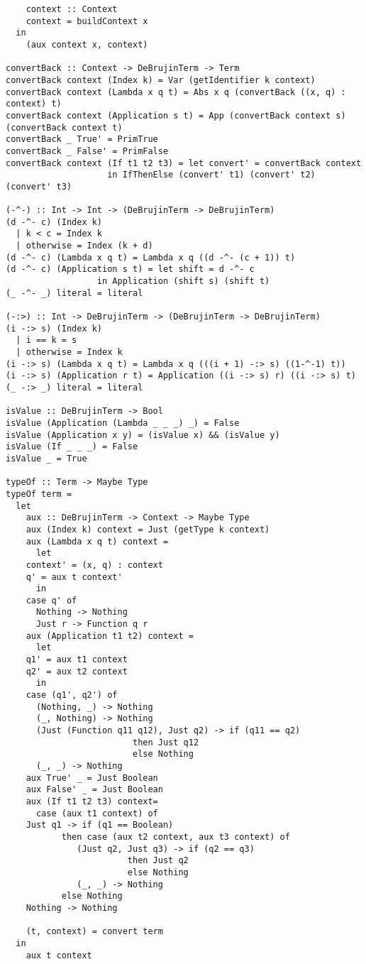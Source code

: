 \documentclass[11pt]{article}
\begin{document}
\begin{verbatim}
    context :: Context
    context = buildContext x
  in
    (aux context x, context)

convertBack :: Context -> DeBrujinTerm -> Term
convertBack context (Index k) = Var (getIdentifier k context)
convertBack context (Lambda x q t) = Abs x q (convertBack ((x, q) : context) t)
convertBack context (Application s t) = App (convertBack context s) (convertBack context t)
convertBack _ True' = PrimTrue
convertBack _ False' = PrimFalse
convertBack context (If t1 t2 t3) = let convert' = convertBack context
				    in IfThenElse (convert' t1) (convert' t2) (convert' t3)

(-^-) :: Int -> Int -> (DeBrujinTerm -> DeBrujinTerm)
(d -^- c) (Index k)
  | k < c = Index k
  | otherwise = Index (k + d)
(d -^- c) (Lambda x q t) = Lambda x q ((d -^- (c + 1)) t)
(d -^- c) (Application s t) = let shift = d -^- c
			      in Application (shift s) (shift t)
(_ -^- _) literal = literal

(-:>) :: Int -> DeBrujinTerm -> (DeBrujinTerm -> DeBrujinTerm)
(i -:> s) (Index k)
  | i == k = s
  | otherwise = Index k
(i -:> s) (Lambda x q t) = Lambda x q (((i + 1) -:> s) ((1-^-1) t))
(i -:> s) (Application r t) = Application ((i -:> s) r) ((i -:> s) t)
(_ -:> _) literal = literal

isValue :: DeBrujinTerm -> Bool
isValue (Application (Lambda _ _ _) _) = False
isValue (Application x y) = (isValue x) && (isValue y)
isValue (If _ _ _) = False
isValue _ = True

typeOf :: Term -> Maybe Type
typeOf term =
  let
    aux :: DeBrujinTerm -> Context -> Maybe Type
    aux (Index k) context = Just (getType k context)
    aux (Lambda x q t) context =
      let
	context' = (x, q) : context
	q' = aux t context'
      in
	case q' of
	  Nothing -> Nothing
	  Just r -> Function q r
    aux (Application t1 t2) context =
      let
	q1' = aux t1 context
	q2' = aux t2 context
      in
	case (q1', q2') of
	  (Nothing, _) -> Nothing
	  (_, Nothing) -> Nothing
	  (Just (Function q11 q12), Just q2) -> if (q11 == q2)
						 then Just q12
						 else Nothing
	  (_, _) -> Nothing
    aux True' _ = Just Boolean
    aux False' _ = Just Boolean
    aux (If t1 t2 t3) context=
      case (aux t1 context) of
	Just q1 -> if (q1 == Boolean)
		   then case (aux t2 context, aux t3 context) of
			  (Just q2, Just q3) -> if (q2 == q3)
						then Just q2
						else Nothing
			  (_, _) -> Nothing
		   else Nothing
	Nothing -> Nothing

    (t, context) = convert term
  in
    aux t context


\end{verbatim}
\end{document}
